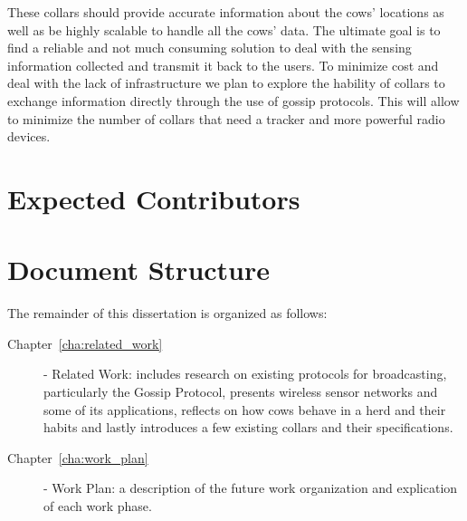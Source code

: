 These collars should provide accurate information about the cows' locations as well as be
highly scalable to handle all the cows' data. The ultimate goal is to find a reliable and
not much consuming solution to deal with the sensing information collected and transmit it
back to the users. To minimize cost and deal with the lack of infrastructure we plan to explore
the hability of collars to exchange information directly through the use of gossip protocols.
This will allow to minimize the number of collars that need a  tracker and
more powerful radio devices.

\section{Expected Contributors}
\label{sec:expected_contributors}

\section{Document Structure}
\label{sec:structure}
The remainder of this dissertation is organized as follows:
\begin{description}
      \item[Chapter~\ref{cha:related_work}] - Related Work: includes research on existing
            protocols for broadcasting, particularly the Gossip Protocol, presents wireless
            sensor networks and some of its applications, reflects on how cows behave in a
            herd and their habits and lastly introduces a few existing collars and their
            specifications.
      \item[Chapter~\ref{cha:work_plan}] - Work Plan: a description of the future work
            organization and explication of each work phase.
\end{description}
